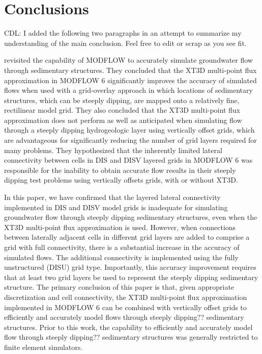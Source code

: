 \documentclass{article}
\begin{document}
\section{Conclusions}

 {\color{red} CDL: I added the following two paragraphs in an attempt to summarize my understanding of the main conclusion.  Feel free to edit or scrap as you see fit.}

\cite{bardot2022} revisited the capability of MODFLOW to accurately simulate groundwater flow through sedimentary structures.  They concluded that the XT3D multi-point flux approximation in MODFLOW 6 significantly improves the accuracy of simulated flows when used with a grid-overlay approach in which locations of sedimentary structures, which can be steeply dipping, are mapped onto a relatively fine, rectilinear model grid.  They also concluded that the XT3D multi-point flux approximation does not perform as well as anticipated when simulating flow through a steeply dipping hydrogeologic layer using vertically offset grids, which are advantageous for significantly reducing the number of grid layers required for many problems.  They hypothesized that the inherently limited lateral connectivity between cells in DIS and DISV layered grids in MODFLOW 6 was responsible for the inability to obtain accurate flow results in their steeply dipping test problems using vertically offsets grids, with or without XT3D.

In this paper, we have confirmed that the layered lateral connectivity implemented in DIS and DISV model grids is inadequate for simulating groundwater flow through steeply dipping sedimentary structures, even when the XT3D multi-point flux approximation is used.  However, when connections between laterally adjacent cells in different grid layers are added to comprise a grid with full connectivity, there is a substantial increase in the accuracy of simulated flows.  The additional connectivity is implemented using the fully unstructured (DISU) grid type.  Importantly, this accuracy improvement requires that at least two grid layers be used to represent the steeply dipping sedimentary structure.  The primary conclusion of this paper is that, given appropriate discretization and cell connectivity, the XT3D multi-point flux approximation implemented in MODFLOW 6 can be combined with vertically offset grids to efficiently and accurately model flows through {\color{red} steeply dipping??} sedimentary structures.  Prior to this work, the capability to efficiently and accurately model flow through {\color{red} steeply dipping??} sedimentary structures was generally restricted to finite element simulators.
\end{document}
